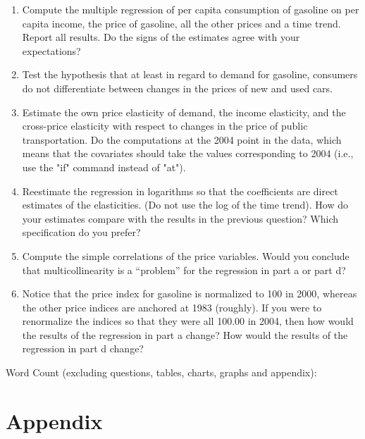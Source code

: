 \documentclass{article}
\begin{document}
\begin{enumerate}[label=\alph*.]
\item Compute the multiple regression of per capita consumption of gasoline on per capita income, the price of gasoline, all the other prices and a time trend. Report all results. Do the signs of the estimates agree with your expectations?
\item Test the hypothesis that at least in regard to demand for gasoline, consumers do not differentiate between changes in the prices of new and used cars.
\item Estimate the own price elasticity of demand, the income elasticity, and the cross-price elasticity with respect to changes in the price of public transportation. Do the computations at the 2004 point in the data, which means that the covariates should take the values corresponding to 2004 (i.e., use the "if" command instead of "at").
\item Reestimate the regression in logarithms so that the coefficients are direct estimates of the elasticities. (Do not use the log of the time trend). How do your estimates compare with the results in the previous question? Which specification do you prefer?
\item Compute the simple correlations of the price variables. Would you conclude that multicollinearity is a ``problem'' for the regression in part a or part d?
\item Notice that the price index for gasoline is normalized to 100 in 2000, whereas the other price indices are anchored at 1983 (roughly). If you were to renormalize the indices so that they were all 100.00 in 2004, then how would the results of the regression in part a change? How would the results of the regression in part d change?
\end{enumerate}


Word Count (excluding questions, tables, charts, graphs and appendix): 

\section{Appendix}



\end{document}

